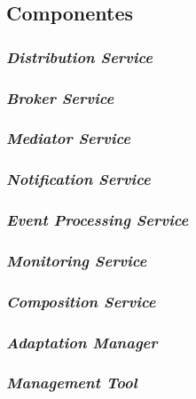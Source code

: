 \subsection{Componentes}

\subsubsection{\textit{Distribution Service}}

\subsubsection{\textit{Broker Service}}

\subsubsection{\textit{Mediator Service}}

\subsubsection{\textit{Notification Service}}

\subsubsection{\textit{Event Processing Service}}

\subsubsection{\textit{Monitoring Service}}

\subsubsection{\textit{Composition Service}}

\subsubsection{\textit{Adaptation Manager}}

\subsubsection{\textit{Management Tool}}


